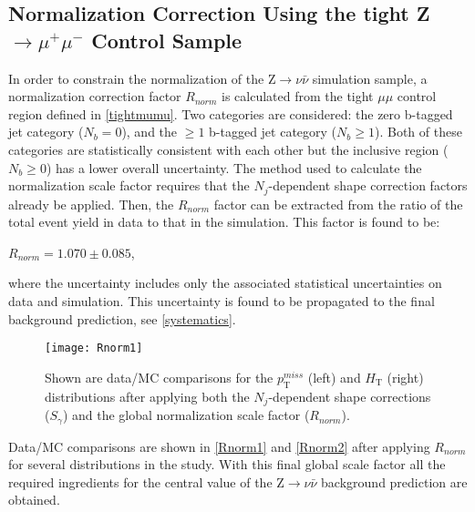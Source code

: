 \subsection{Normalization Correction Using the tight Z$\rightarrow\mu^{+}\mu^{-}$ Control Sample}\label{tightmumu}

In order to constrain the normalization of the Z$\rightarrow\nu\bar{\nu}$ simulation sample, a normalization correction factor $R_{norm}$ is calculated from the tight $\mu\mu$ control region defined in \autoref{tightmumu}. Two categories are considered: the zero b-tagged jet category ($N_b = 0$), and the $\geq 1$ b-tagged jet category ($N_b \geq 1$). Both of these categories are statistically consistent with each other but the inclusive region ($N_b \geq 0$) has a lower overall uncertainty. The method used to calculate the normalization scale factor requires that the $N_j$-dependent shape correction factors already be applied. Then, the $R_{norm}$ factor can be extracted from the ratio of the total event yield in data to that in the simulation. This factor is found to be:

\begingroup
	\begin{center}
		$R_{norm} = 1.070 \pm 0.085$,
	\end{center}
\endgroup

\noindent where the uncertainty includes only the associated statistical uncertainties on data and simulation. This uncertainty is found to be propagated to the final background prediction, see \autoref{systematics}.\\

\begin{figure}[H]
\begin{center}
\texttt{[image: Rnorm1]}
\end{center}
\vspace{-1em}
\caption{Shown are data/MC comparisons for the $p_\text{T}^{miss}$ (left) and $H_\text{T}$ (right) distributions after applying both the $N_j$-dependent shape corrections ($S_\gamma$) and the global normalization scale factor ($R_{norm}$).}
\label{Rnorm1}
\end{figure}

\vspace{1em}

Data/MC comparisons are shown in \autoref{Rnorm1} and \autoref{Rnorm2} after applying $R_{norm}$ for several distributions in the study. With this final global scale factor all the required ingredients for the central value of the Z$\rightarrow\nu\bar{\nu}$ background prediction are obtained. 

